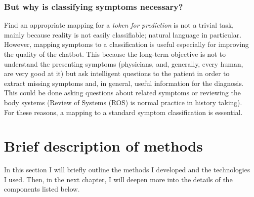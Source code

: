 \subsubsection{But why is  classifying symptoms necessary?}
Find an appropriate mapping for a \textit{token for prediction} is not a trivial task, mainly because reality is not easily classifiable; natural language in particular. However, mapping symptoms to a classification is useful especially for improving the quality of the chatbot. This because the long-term objective is not to understand the presenting symptoms (physicians, and, generally, every human, are very good at it) but ask intelligent questions to the patient in order to extract missing symptoms and, in general, useful information for the diagnosis. This could be done asking questions about related symptoms or reviewing the body systems (Review of Systems (ROS) is normal practice in history taking). For these reasons, a mapping to a standard symptom classification is essential.


%

\section{Brief description of methods}
\label{sec:brief_methods}

In this section I will briefly outline the methods I developed and the technologies I used. Then, in the next chapter, I  will deepen more into the details of the components listed below.

